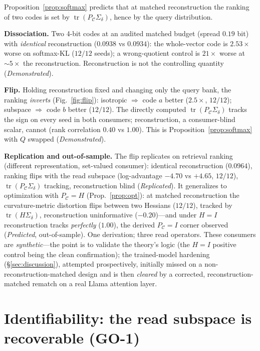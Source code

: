 \documentclass[lettersize,onecolumn]{IEEEtran}
\theoremstyle{definition}
\theoremstyle{remark}
\newcommand{\PC}{P_{\mathcal{C}}}
\newcommand{\Sd}{\Sigma_{\delta}}
\newcommand{\tr}{\operatorname{tr}}
\begin{document}
Proposition~\ref{prop:softmax} predicts that at matched reconstruction the ranking of
two codes is set by $\tr(\PC\Sd)$, hence by the query distribution.



\noindent\textbf{Dissociation.} Two 4-bit codes at an audited matched budget (spread
$0.19$ bit) with \emph{identical} reconstruction ($0.0938$ vs $0.0934$): the
whole-vector code is $2.53\times$ worse on softmax-KL ($12/12$ seeds); a
wrong-quotient control is $21\times$ worse at $\sim\!5\times$ the reconstruction.
Reconstruction is not the controlling quantity (\emph{Demonstrated}).



\noindent\textbf{Flip.} Holding reconstruction fixed and changing only the query bank, the
ranking \emph{inverts} (Fig.~\ref{fig:flip}): isotropic $\Rightarrow$ code $a$ better ($2.5\times$,
$12/12$); subspace $\Rightarrow$ code $b$ better ($12/12$). The directly computed
$\tr(\PC\Sd)$ tracks the sign on every seed in both consumers; reconstruction, a
consumer-blind scalar, cannot (rank correlation $0.40$ vs $1.00$). This is
Proposition~\ref{prop:softmax} with $Q$ swapped (\emph{Demonstrated}).



\noindent\textbf{Replication and out-of-sample.} The flip replicates on retrieval ranking
(different representation, set-valued consumer): identical reconstruction
($0.0964$), ranking flips with the read subspace (log-advantage $-4.70$ vs $+4.65$,
$12/12$), $\tr(\PC\Sd)$ tracking, reconstruction blind (\emph{Replicated}). It
generalizes to optimization with $\PC=H$ (Prop.~\ref{prop:opt}): at matched
reconstruction the curvature-metric distortion flips between two Hessians ($12/12$),
tracked by $\tr(H\Sd)$, reconstruction uninformative ($-0.20$)---and under $H=I$
reconstruction tracks \emph{perfectly} ($1.00$), the derived $\PC=I$ corner observed
(\emph{Predicted}, out-of-sample). One derivation; three read operators. These
consumers are \emph{synthetic}---the point is to validate the theory's logic (the
$H=I$ positive control being the clean confirmation); the trained-model hardening
(\S\ref{sec:discussion}), attempted prospectively, initially missed on a
non-reconstruction-matched design and is then \emph{cleared} by a corrected,
reconstruction-matched rematch on a real Llama attention layer.

\section{Identifiability: the read subspace is recoverable (GO-1)}\label{sec:id}
\end{document}
